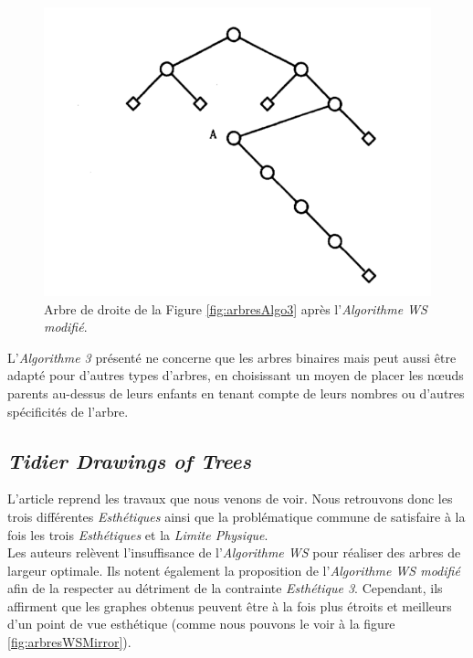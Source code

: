 \documentclass{article}
\begin{document}
    \vfill
    \begin{figure}[h]
        \begin{center}
      		\includegraphics[scale=0.6]{arbreWS.png}
        \end{center}
    	\caption{Arbre de droite de la Figure \ref{fig:arbresAlgo3} après l'\emph{Algorithme WS modifié}. \cite{article79}}
      \label{fig:arbresAlgoWS}
    \end{figure}
    \vfill
    
    L'\emph{Algorithme 3} présenté ne concerne que les arbres binaires mais peut aussi être adapté pour d'autres types d'arbres, en choisissant un moyen de placer les n\oe{}uds parents au-dessus de leurs enfants en tenant compte de leurs nombres ou d'autres spécificités de l'arbre.\\

\newpage
  \subsection{\emph{Tidier Drawings of Trees}}

  L'article \cite{article81} reprend les travaux que nous venons de voir. Nous retrouvons donc les trois différentes \emph{Esthétiques} ainsi que la problématique commune de satisfaire à la fois les trois \emph{Esthétiques} et la \emph{Limite Physique}.\\

  Les auteurs relèvent l'insuffisance de l'\emph{Algorithme WS} pour réaliser des arbres de largeur optimale. Ils notent également la proposition de l'\emph{Algorithme WS modifié} afin de la respecter au détriment de la contrainte \emph{Esthétique 3}. Cependant, ils affirment que les graphes obtenus peuvent être à la fois plus étroits et meilleurs d'un point de vue esthétique (comme nous pouvons le voir à la figure \ref{fig:arbresWSMirror}).\\
\end{document}
